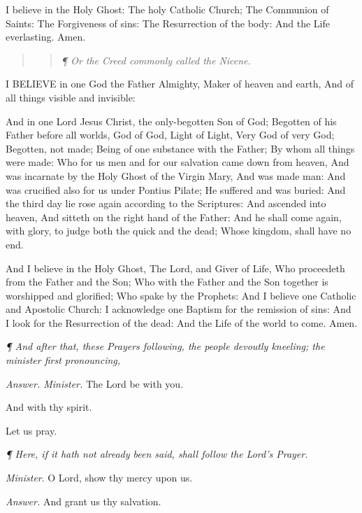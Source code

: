 I believe in the Holy Ghost: The holy Catholic Church;
The Communion of Saints: The Forgiveness of sins: The Resurrection of
the body: And the Life everlasting. Amen.

\begin{quote}

\begin{quote}

\emph{¶
Or the Creed commonly called the Nicene.}

\end{quote}

\end{quote}

I
BELIEVE
in one God the Father Almighty, Maker of heaven and earth, And of all
things visible and invisible:

And in one Lord Jesus Christ, the only-begotten Son
of God; Begotten of his Father before all worlds, God of God, Light of
Light, Very God of very God; Begotten, not made; Being of one substance
with the Father; By whom all things were made: Who for us men and for
our salvation came down from heaven, And was incarnate by the Holy Ghost
of the Virgin Mary, And was made man: And was crucified also for us under
Pontius Pilate; He suffered and was buried: And the third day lie rose
again according to the Scriptures: And ascended into heaven, And sitteth
on the right hand of the Father: And he shall come again, with glory,
to judge both the quick and the dead; Whose kingdom, shall have no end.

And I believe in the Holy Ghost, The Lord, and Giver
of Life, Who proceedeth from the Father and the Son; Who with the Father
and the Son together is worshipped and glorified; Who spake by the Prophets:
And I believe one Catholic and Apostolic Church: I acknowledge one Baptism
for the remission of sins: And I look for the Resurrection of the dead:
And the Life of the world to come. Amen.

\emph{¶
And after that, these Prayers following, the people devoutly kneeling;
the minister first pronouncing,}

\emph{Answer. Minister.} The
Lord be with you.

And with thy spirit. 

Let us pray.

\emph{¶ Here, if it hath not already been said, shall follow the Lord's
Prayer.}

\emph{Minister}.
O Lord, show thy
mercy upon us.

\emph{Answer.} And
grant us thy salvation.

